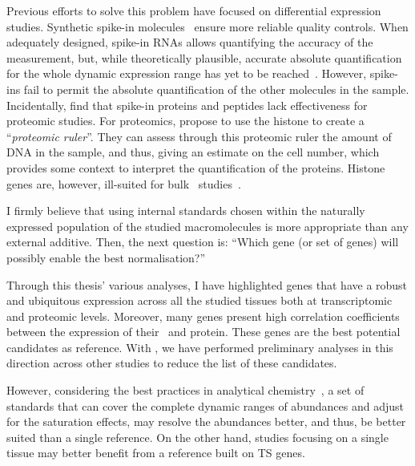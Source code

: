 Previous efforts to solve this problem have focused
on differential expression studies.
Synthetic spike-in molecules~
ensure more reliable quality controls.
When adequately designed, spike-in \glspl{RNA}
allows quantifying the accuracy of the measurement,
but, while theoretically plausible,
accurate absolute quantification for the whole dynamic expression range
has yet to be reached~.
However, spike-ins fail to permit the absolute quantification
of the other molecules in the sample.
Incidentally, \citet{Rudnick2014-ar} find that spike-in proteins and peptides
lack effectiveness for proteomic studies.
For proteomics, \citet{Wisniewski2014-kh} propose
to use the histone to create a \enquote{\emph{proteomic ruler}}.
They can assess through this proteomic ruler the amount of \gls{DNA}
in the sample, and thus, giving an estimate on the cell number,
which provides some context to interpret the quantification of the proteins.
Histone genes are, however, ill-suited
for bulk \Rnaseq\ studies~.\mybr\

I firmly believe that using internal standards chosen
within the naturally expressed population of the studied macromolecules
is more appropriate than any external additive.
Then, the next question is:
\enquote{Which gene (or set of genes) will possibly enable the best normalisation?}

Through this thesis' various analyses,
I have highlighted genes that have a robust and ubiquitous expression
across all the studied tissues
both at transcriptomic and proteomic levels.
Moreover, many genes present high correlation coefficients
between the expression of their \mRNA\ and protein.
These genes are the best potential candidates as reference.
With \nuno, we have performed preliminary analyses
in this direction across other studies
to reduce the list of these candidates.

However,
considering the best practices in analytical chemistry~,
a set of standards that can cover the complete dynamic ranges of abundances
and adjust for the saturation effects,
may resolve the abundances better,
and thus, be better suited than a single reference.
On the other hand, studies focusing on a single tissue
may better benefit from a reference built on \gls{TS} genes.


